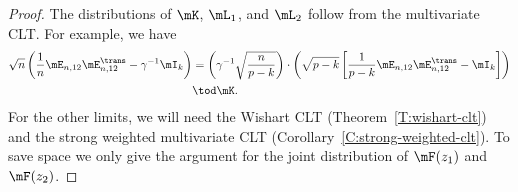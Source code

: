 \begin{proof}
    The distributions of $\mK$, $\mL_1$, and $\mL_2$ follow from the 
    multivariate CLT.  For example, we have
    \begin{align*}
        \sqrt{n}
        \left(
            \frac{1}{n} \mE_{n,12} \mE_{n,12}^\trans
            -
            \gamma^{-1}
            \mI_k
        \right)
            &=
                \left(
                    \gamma^{-1}
                    \sqrt{ \frac{ n }{ p - k } }
                \right)
                \cdot
                \left(
                    \sqrt{ p - k }
                    \left[
                        \frac{1}{p-k}
                        \mE_{n,12} \mE_{n,12}^\trans
                        -
                        \mI_k
                    \right]
                \right) \\
            &\tod
                \mK.
    \end{align*}
    For the other limits, we will need the Wishart CLT 
    (Theorem~\ref{T:wishart-clt}) and the strong weighted multivariate CLT
    (Corollary~\ref{C:strong-weighted-clt}).  To save space we only
    give the argument for the joint distribution of $\mF(z_1)$ and 
    $\mF(z_2)$.
    

\end{proof}
